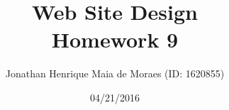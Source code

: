 \title{Web Site Design \\ Homework 9}
\author{Jonathan Henrique Maia de Moraes (ID: 1620855)}
\date{04/21/2016}
\maketitle
